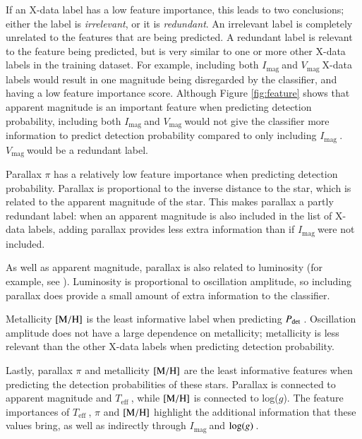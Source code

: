 \documentclass[a4paper,fleqn,usenatbib,useAMS]{mnras}
\newcommand{\teff}{\ensuremath{T_{\textrm{eff}}\:}}
\newcommand{\pdet}{\ensuremath{P_{\rm det}\:}}
\newcommand{\imag}{\ensuremath{I_{\textrm{mag}}\:}}
\newcommand{\vmag}{\ensuremath{V_{\textrm{mag}}\:}}
\newcommand{\logg}{\ensuremath{{\rm log}(g)\:}}
\begin{document}
If an X-data label has a low feature importance, this leads to two conclusions; either the label is {\it irrelevant}, or it is {\it redundant}. An irrelevant label is completely unrelated to the features that are being predicted. A redundant label is relevant to the feature being predicted, but is very similar to one or more other X-data labels in the training dataset. For example, including both \imag and \vmag X-data labels would result in one magnitude being disregarded by the classifier, and having a low feature importance score. Although Figure \ref{fig:feature} shows that apparent magnitude is an important feature when predicting detection probability, including both \imag and \vmag would not give the classifier more information to predict detection probability compared to only including \imag. \vmag would be a redundant label. 

Parallax $\pi$ has a relatively low feature importance when predicting detection probability. Parallax is proportional to the inverse distance to the star, which is related to the apparent magnitude of the star. This makes parallax a partly redundant label: when an apparent magnitude is also included in the list of X-data labels, adding parallax provides less extra information than if \imag were not included.

As well as apparent magnitude, parallax is also related to luminosity (for example, see \citet{torres_accurate_2010}). Luminosity is proportional to oscillation amplitude, so including parallax does provide a small amount of extra information to the classifier.

Metallicity $\rm [M/H]$ is the least informative label when predicting \pdet. Oscillation amplitude does not have a large dependence on metallicity; metallicity is less relevant than the other X-data labels when predicting detection probability.


Lastly, parallax $\pi$ and metallicity $\rm [M/H]$ are the least informative features when predicting the detection probabilities of these stars. Parallax is connected to apparent magnitude and \teff, while $\rm [M/H]$ is connected to log($g$). The feature importances of \teff, $\pi$ and $\rm [M/H]$ highlight the additional information that these values bring, as well as indirectly through \imag and \logg.




 
\end{document}
